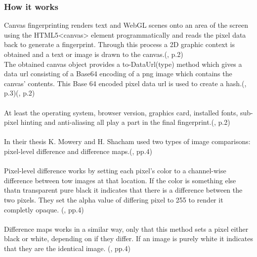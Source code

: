 \subsubsection{How it works}
Canvas fingerprinting renders text and WebGL scenes onto an area of the screen using the HTML5<canvas> element programmatically and reads the pixel data back to generate a fingerprint. Through this process a 2D graphic context is obtained and a text or image is drawn to the canvas.(\textcite{upi15}, p.2)\\
The obtained canvas object provides a to-DataUrl(type) method which gives a data url consisting of a Base64 encoding of a png image which contains the canvas' contents. This Base 64 encoded pixel data url is used to create a hash.(\textcite{mowery12}, p.3)(\textcite{upi15}, p.2)\\\\
At least the operating system, browser version, graphics card, installed fonts, sub-pixel hinting and anti-aliasing all play a part in the final fingerprint.(\textcite{upi15}, p.2) \\\\
In their thesis K. Mowery and H. Shacham used two types of image comparisons: pixel-level difference and difference maps.(\textcite{mowery12}, pp.4)\\\\
Pixel-level difference works by setting each pixel's color to a channel-wise difference between tow images at that location. If the color is something else thatn transparent pure black it indicates that there is a difference between the two pixels. They set the alpha value of differing pixel to 255 to render it completly opaque. (\textcite{mowery12}, pp.4)\\\\
Difference maps works in a similar way, only that this method sets a pixel either black or white, depending on if they differ. If an image is purely white it indicates that they are the identical image. (\textcite{mowery12}, pp.4)



